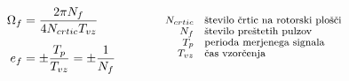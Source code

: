 \documentclass[a4paper,twoside,openright,12pt]{book}
\begin{document}
\begin{equation} \label{inkr_enkoder_omega_metodaf}
\begin{aligned}
\Omega_f & =\frac{2\pi N_f}{4N_{crtic}T_{vz}}\\[5pt]
e_f & =\pm\frac{T_p}{T_{vz}}=\pm\frac{1}{N_f}
\end{aligned}
\qquad\qquad\parbox{4.0cm}{\footnotesize$
	\begin{aligned} 
	N_{crtic} & \quad \text{število črtic na rotorski plošči}\\[-1.0ex] 
	N_f & \quad \text{število preštetih pulzov}\\[-1.0ex] 
	T_p & \quad \text{perioda merjenega signala}\\[-1.0ex]
	T_{vz} & \quad \text{čas vzorčenja}\\[5pt]
	\end{aligned}$}
\end{equation}
\end{document}
